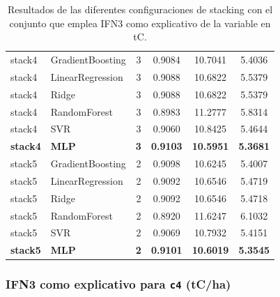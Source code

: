 \begin{table}
\begin{tabular}{llcccc}
        stack4 & GradientBoosting & 3 & 0.9084 & 10.7041 & 5.4036 \\
        stack4 & LinearRegression & 3 & 0.9088 & 10.6822 & 5.5379 \\
        stack4 & Ridge            & 3 & 0.9088 & 10.6822 & 5.5379 \\
        stack4 & RandomForest     & 3 & 0.8983 & 11.2777 & 5.8314 \\
        stack4 & SVR              & 3 & 0.9060 & 10.8425 & 5.4644 \\
        \textbf{stack4} & \textbf{MLP} & \textbf{3} & \textbf{0.9103} & \textbf{10.5951} & \textbf{5.3681} \\
        \hline
        stack5 & GradientBoosting & 2 & 0.9098 & 10.6245 & 5.4007 \\
        stack5 & LinearRegression & 2 & 0.9092 & 10.6546 & 5.4719 \\
        stack5 & Ridge            & 2 & 0.9092 & 10.6546 & 5.4718 \\
        stack5 & RandomForest     & 2 & 0.8920 & 11.6247 & 6.1032 \\
        stack5 & SVR              & 2 & 0.9069 & 10.7932 & 5.4151 \\
        \textbf{stack5} & \textbf{MLP} & \textbf{2} & \textbf{0.9101} & \textbf{10.6019} & \textbf{5.3545} \\
        \hline
    \end{tabular}
    \caption{Resultados de las diferentes configuraciones de stacking con el conjunto que emplea IFN3 como explicativo de la variable en tC.}
    \label{tab:stack_ifn3_tc}
\end{table}

\subsubsection{IFN3 como explicativo para \texttt{c4} (tC/ha)}

